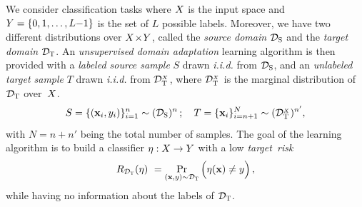 We consider classification tasks where $X$ is the input space and $Y=\{0,1,\ldots,L{-}1\}$ is the set of $L$ possible labels.
Moreover, we have two different distributions over $X\!\times\! Y$, called the {\it source domain} ${{\mathcal{D}}_\textsc{S}}$ and the {\it target domain} ${{\mathcal{D}}_\textsc{T}}$.
An \emph{unsupervised domain adaptation} learning algorithm is then provided with a {\it labeled source sample} $S$ drawn {\it i.i.d.} from ${{\mathcal{D}}_\textsc{S}}$, and an {\it unlabeled target sample} $T$ drawn {\it i.i.d.} from ${{\mathcal{D}}_\textsc{T}^{_X}}$, where ${{\mathcal{D}}_\textsc{T}^{_X}}$ is the marginal distribution of ${{\mathcal{D}}_\textsc{T}}$ over~$X$.
\begin{equation*}
S = \{({\mathbf x}_i,y_i)\}_{i=1}^{n} \sim ({{\mathcal{D}}_\textsc{S}})^n 
\,; \quad
T = \{{\mathbf x}_i\}_{i=n+1}^{N} \sim ({{\mathcal{D}}_\textsc{T}^{_X}})^{n'},
\end{equation*}
with $N=n+n'$ being the total number of samples. 
%
The goal of the learning algorithm is to build a classifier $\eta:X\to Y$ with a low \emph{target~risk}
\begin{equation*}
R_{{{\mathcal{D}}_\textsc{T}}}(\eta) \ = \Pr_{({\mathbf x},y) \sim {{\mathcal{D}}_\textsc{T}}} \Big(\eta({\mathbf x}) \neq y\Big)\,,
\end{equation*}
while having no information about the labels of ${{\mathcal{D}}_\textsc{T}}$.


